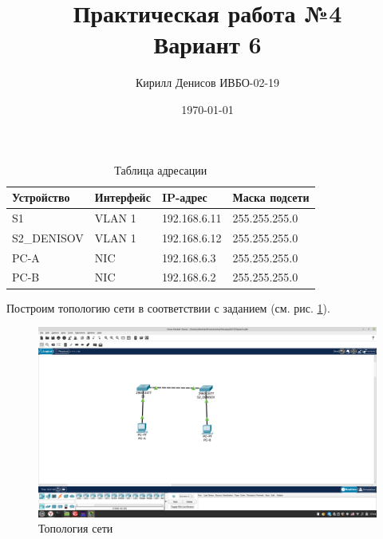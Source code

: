 \documentclass[a4paper,14pt]{extarticle}
\author{Кирилл Денисов ИВБО-02-19}
\title{Практическая работа №4\\Вариант 6}
\date{\today}
\newcommand{\pathToCommonFolder}{/home/denilai/Documents/repos/latex/Common}
\begin{document}
	\newpage
	\newpage
\maketitle

\begin{table}[htbp]
\begin{center}
		\caption{Таблица адресации}
	\begin{tabular}{|l|l|l|l|}
		\hline
		Устройство  & Интерфейс & IP-адрес & Маска подсети \\ \hline
		S1 & VLAN 1 & 192.168.6.11 & 255.255.255.0 \\ \hline
		S2\_DENISOV & VLAN 1 & 192.168.6.12 & 255.255.255.0 \\ \hline
		PC-A & NIC & 192.168.6.3 & 255.255.255.0 \\ \hline
		PC-B & NIC & 192.168.6.2 & 255.255.255.0 \\ \hline
	\end{tabular}
	\label{tab:adress}
\end{center}
\end{table}

Построим топологию сети в соответствии с заданием (см. рис. \ref{fig:topology4}).
\begin{figure}[h!]
	\centering
	\includegraphics[width=0.7\linewidth]{images/topology4}
	\caption{Топология сети}
	\label{fig:topology4}
\end{figure}
\end{document}
